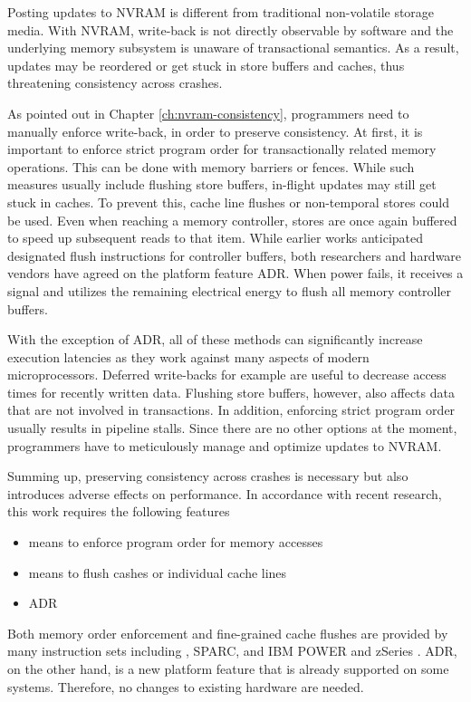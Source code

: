 Posting updates to \ac{NVRAM} is different from traditional non-volatile storage
media. With \ac{NVRAM}, write-back is not directly observable by software and the
underlying memory subsystem is unaware of transactional semantics. As a result,
updates may be reordered or get stuck in store buffers and caches, thus
threatening consistency across crashes.

As pointed out in Chapter \ref{ch:nvram-consistency}, programmers need to
manually enforce write-back, in order to preserve consistency. At first, it is
important to enforce strict program order for transactionally related memory
operations. This can be done with memory barriers or fences. While such measures
usually include flushing store buffers, in-flight updates may still get stuck in
caches. To prevent this, cache line flushes or non-temporal stores could be
used. Even when reaching a memory controller, stores are once again buffered to
speed up subsequent reads to that item. While earlier works anticipated
designated flush instructions for controller buffers, both researchers and
hardware vendors have agreed on the platform feature \ac{ADR}. When power fails, it
receives a signal and utilizes the remaining electrical energy to flush all
memory controller buffers.

With the exception of \ac{ADR}, all of these methods can significantly increase
execution latencies as they work against many aspects of modern microprocessors.
Deferred write-backs for example are useful to decrease access times for
recently written data. Flushing store buffers, however, also affects data that
are not involved in transactions. In addition, enforcing strict program order
usually results in pipeline stalls. Since there are no other options at the
moment, programmers have to meticulously manage and optimize updates to \ac{NVRAM}.

Summing up, preserving consistency across crashes is necessary but also
introduces adverse effects on performance. In accordance with recent research,
this work requires the following features

\begin{itemize}
    \item means to enforce program order for memory accesses
    \item means to flush cashes or individual cache lines
    \item \ac{ADR}
\end{itemize}

Both memory order enforcement and fine-grained cache flushes are provided by
many instruction sets including , SPARC, and IBM POWER and zSeries
\cite{mckenney2007memory}. \ac{ADR}, on the other hand, is a new platform feature
that is already supported on some systems. Therefore, no changes to existing
hardware are needed.

